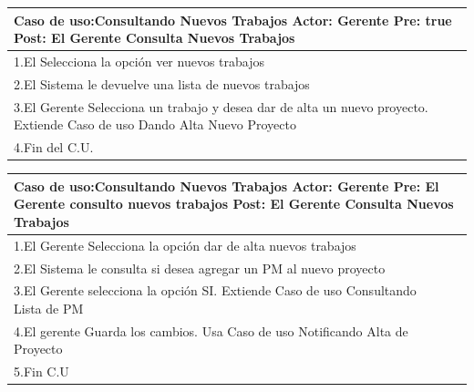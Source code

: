 \begin{longtable}{|p{}|p{}|}
    \hline
    \multicolumn{2}{|p{16cm}|}{
        \textbf{Caso de uso:}Consultando Nuevos Trabajos\newline
        \textbf{Actor:} Gerente\newline
        \textbf{Pre: }true\newline
        \textbf{Post:}  El Gerente Consulta Nuevos Trabajos
    }\\
    \hline
    1.El Selecciona la opción ver nuevos trabajos&    \\
    \hline
    2.El Sistema le devuelve una lista de nuevos trabajos& \\
    \hline
    3.El Gerente Selecciona un trabajo y desea dar de alta un nuevo proyecto. Extiende Caso de uso Dando Alta Nuevo Proyecto\\
    \hline
    4.Fin del C.U.&\\
    \hline
\end{longtable}

\begin{longtable}{|p{}|p{}|}
    \hline
    \multicolumn{2}{|p{16cm}|}{
        \textbf{Caso de uso:}Consultando Nuevos Trabajos\newline
        \textbf{Actor:} Gerente\newline
        \textbf{Pre: }El Gerente consulto nuevos trabajos\newline
        \textbf{Post:}  El Gerente Consulta Nuevos Trabajos
    }\\
    \hline
    1.El Gerente Selecciona  la opción dar de alta nuevos trabajos&    \\
    \hline
    2.El Sistema le consulta si desea agregar un PM al nuevo proyecto& \\
    \hline
    3.El Gerente selecciona la opción SI. Extiende Caso de uso Consultando Lista de PM\\
    \hline
    4.El gerente Guarda los cambios. Usa Caso de uso Notificando Alta de Proyecto&\\
    \hline
    5.Fin C.U&\\
    \hline
\end{longtable}

